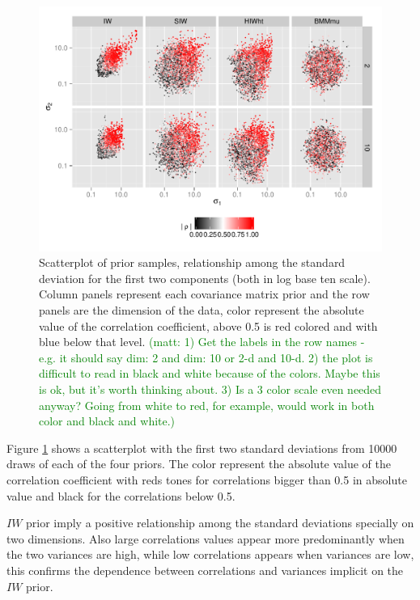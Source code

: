 \documentclass[a4paper]{article}
\newcommand{\matt}[1]{\textcolor{green}{(matt: #1)}}
\begin{document}
\begin{figure}[htbp]
\begin{center}
 \includegraphics[width=\textwidth ]{prior_sis2} 
  \vspace{-.5in}
\caption{Scatterplot of prior samples, relationship among the standard deviation for the first two components (both in log base ten scale).  Column panels represent each covariance matrix prior and the row panels are the dimension of the data, color represent the absolute value of the correlation coefficient, above 0.5 is red colored and with blue below that level.  \label{priorF2} 
\matt{ 1) Get the labels in the row names - e.g. it should say dim: 2 and dim: 10 or 2-d and 10-d. 2) the plot is difficult to read in black and white because of the colors. Maybe this is ok, but it's worth thinking about. 3) Is a 3 color scale even needed anyway? Going from white to red, for example, would work in both color and black and white.} }
\end{center}
\end{figure}

Figure \ref{priorF2} shows a scatterplot with the first two standard deviations from 10000 draws of each of the four priors. The color represent the absolute value of the correlation coefficient with reds tones for correlations bigger than 0.5 in absolute value and black for the correlations below 0.5. 

$IW$ prior imply a positive relationship among the standard deviations specially on two dimensions. Also large correlations values appear more predominantly when the two variances are high, while low correlations appears when variances are low, this confirms the dependence between correlations and variances implicit on the $IW$ prior. 
\end{document}

